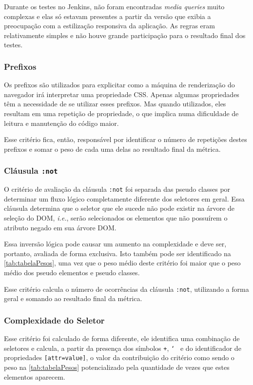 Durante os testes no Jenkins, não foram encontradas \textit{media queries} muito complexas e elas só estavam presentes a partir da versão que exibia a preocupação com a estilização responsiva da aplicação. As regras eram relativamente simples e não houve grande participação para o resultado final dos testes.

\subsubsection{Prefixos}
Os prefixos são utilizados para explicitar como a máquina de renderização do navegador irá interpretar uma propriedade CSS. Apenas algumas propriedades têm a necessidade de se utilizar esses prefixos. Mas quando utilizados, eles resultam em uma repetição de propriedade, o que implica numa dificuldade de leitura e manutenção do código maior.

Esse critério fica, então, responsável por identificar o número de repetições destes prefixos e somar o peso de cada uma delas ao resultado final da métrica.

\subsubsection{Cláusula \texttt{:not}}
O critério de avaliação da cláusula \texttt{:not} foi separada das pseudo classes por determinar um fluxo lógico completamente diferente dos seletores em geral. Essa cláusula determina que o seletor que ele sucede não pode existir na árvore de seleção do DOM, \textit{i.e.}, serão selecionados os elementos que não possuírem o atributo negado em sua árvore DOM.

Essa inversão lógica pode causar um aumento na complexidade e deve ser, portanto, avaliada de forma exclusiva. Isto também pode ser identificado na \autoref{tab:tabelaPesos}, uma vez que o peso médio deste critério foi maior que o peso médio dos pseudo elementos e pseudo classes.

Esse critério calcula o número de ocorrências da cláusula \texttt{:not}, utilizando a forma geral e somando ao resultado final da métrica.

\subsubsection{Complexidade do Seletor}
Esse critério foi calculado de forma diferente, ele identifica uma combinação de seletores e calcula, a partir da presença dos símbolos \texttt{+}, \texttt{\char`~} e do identificador de propriedades \texttt{[attr=value]}, o valor da contribuição do critério como sendo o peso na \autoref{tab:tabelaPesos} potencializado pela quantidade de vezes que estes elementos aparecem.

